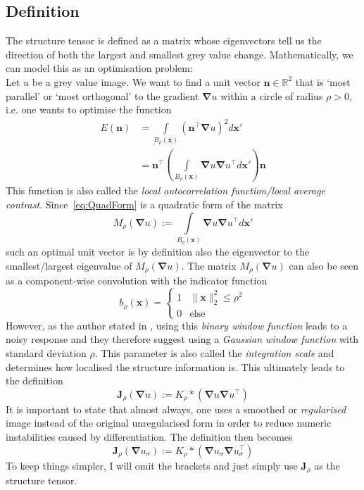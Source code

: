\subsection{Definition}
The structure tensor is defined as a matrix whose eigenvectors tell us the direction of
both the largest and smallest grey value change. Mathematically, we can model this
as an optimisation problem:\\
Let $u$ be a grey value image.
We want to find a unit vector $\mathbf{n} \in \mathbb{R}^2$ that is `most parallel' or `most orthogonal' to the
gradient $\boldsymbol\nabla u$ within a circle of radius $\rho > 0$, i.e. one wants to optimise the
function
\begin{align}
    E(\mathbf{n}) &= \int\limits_{B_\rho(\boldsymbol x)} \left(\mathbf{n}^\top\boldsymbol\nabla
        u\right)^2d\boldsymbol x'\\
    &= \mathbf{n}^\top \left(\int\limits_{B_\rho(\boldsymbol x)} \boldsymbol\nabla u \boldsymbol\nabla
        u^\top d\boldsymbol x' \right) \mathbf{n}\label{eq:QuadForm}
\end{align}
This function is also called the \textit{local autocorrelation function/local average
    contrast}\cite{harris88, ipcv19-13}.
Since~\eqref{eq:QuadForm} is a quadratic form of the matrix
\[M_\rho(\boldsymbol\nabla u) := \int\limits_{B_\rho(\boldsymbol x)} \boldsymbol\nabla u \boldsymbol\nabla
    u^\top d\boldsymbol x'\]
such an optimal unit vector is by definition also the eigenvector to the smallest/largest
eigenvalue of $M_\rho(\boldsymbol\nabla u)$\cite{ipcv19-13}.
The matrix $M_\rho(\boldsymbol\nabla u)$ can also be seen as a component-wise convolution with the indicator
function
\[b_\rho(\boldsymbol x) = \begin{cases} 1 & \lVert \boldsymbol x\rVert_2^2 \leq \rho^2\\ 0 & \text{else} \end{cases}\]
However, as the author stated in \cite{harris88}, using this \textit{binary window function} leads
to a noisy response and they therefore suggest using a \textit{Gaussian window function} with standard
deviation $\rho$. This parameter is also
called the \textit{integration scale} and determines how localised the structure information
is\cite{ipcv19-13}.
This ultimately leads to the definition
\begin{equation}
    \mathbf{J}_\rho(\boldsymbol\nabla u) := K_\rho * (\boldsymbol\nabla u\boldsymbol\nabla u^\top)
\end{equation}
It is important to state that almost always, one uses a smoothed or \textit{regularised} image instead of the
original unregularised form in order to reduce numeric instabilities caused by
differentiation\cite{ipcv19-12}. The definition then becomes
\begin{equation}
    \mathbf{J}_\rho(\boldsymbol\nabla u_\sigma) := K_\rho * (\boldsymbol\nabla u_\sigma\boldsymbol\nabla
    u_\sigma^\top)\label{def:StructTensor}
\end{equation}
To keep things simpler, I will omit the brackets and just simply use $\mathbf{J}_\rho$ as the
structure tensor.\\
